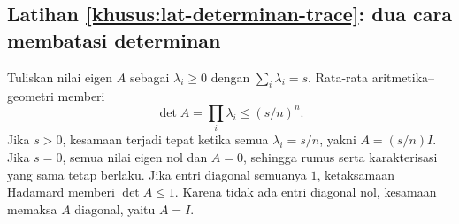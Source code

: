 \subsection*{Latihan \ref{khusus:lat-determinan-trace}: dua cara membatasi determinan}
Tuliskan nilai eigen $A$ sebagai $\lambda_i\ge0$ dengan
$\sum_i\lambda_i=s$. Rata-rata aritmetika--geometri memberi
\[
    \det A=\prod_i\lambda_i\le(s/n)^n.
\]
Jika $s>0$, kesamaan terjadi tepat ketika semua
$\lambda_i=s/n$, yakni $A=(s/n)I$.
Jika $s=0$, semua nilai eigen nol dan $A=0$, sehingga rumus
serta karakterisasi yang sama tetap berlaku.
Jika entri diagonal semuanya $1$, ketaksamaan Hadamard memberi
$\det A\le1$. Karena tidak ada entri diagonal nol, kesamaan
memaksa $A$ diagonal, yaitu $A=I$.
\fi

